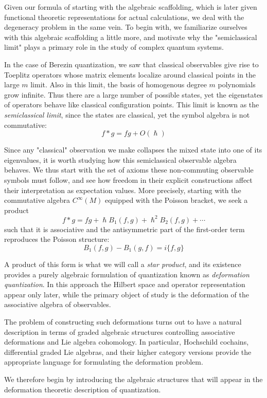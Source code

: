 \documentclass[
  12pt,
  a4paper, oneside
]{report}
\renewcommand{\hbar}{\hslash}
\theoremstyle{bolddef}
\theoremstyle{remark}
\numberwithin{equation}{chapter}
\begin{document}
Given our formula of starting with the algebraic scaffolding, which is later given functional theoretic representations for actual calculations, we deal with the degeneracy problem in the same vein. To begin with, we familiarize ourselves with this algebraic scaffolding a little more, and motivate why the "semiclassical limit" plays a  primary role in the study of complex quantum systems. 

In the case of Berezin quantization, we saw that classical observables give rise to Toeplitz operators whose matrix elements localize around classical points in the large $m$ limit. Also in this limit, the basis of homogenous degree $m$ polynomials grow infinite. Thus there are a large number of possible states, yet the eigenstates of operators behave like classical configuration points. This limit is known as the \textit{semiclassical limit}, since the states are classical, yet the symbol algebra is not commutative: 
$$
f * g = fg + O(\hbar)
$$

Since any "classical" observation we make collapses the mixed state into one of its eigenvalues, it is worth studying how this semiclassical observable algebra behaves. We thus start with the set of axioms these non-commuting observable symbols must follow, and see how freedom in their explicit constructions affect their interpretation as expectation values. More precisely, starting with the commutative algebra $C^\infty(M)$ equipped with the Poisson bracket, we seek a product
$$
f * g = fg + \hbar B_1(f,g) + \hbar^2 B_2(f,g) + \cdots
$$
such that it is associative and the antisymmetric part of the first-order term reproduces the Poisson structure:
$$
B_1(f,g) - B_1(g,f) = i\{f,g\}
$$

A product of this form is what we will call a \emph{star product}, and its existence
provides a purely algebraic formulation of quantization known as
\emph{deformation quantization}. In this approach the Hilbert space and operator representation appear only later, while the primary object of study is the deformation of the associative algebra of observables.

The problem of constructing such deformations turns out to have a natural description in terms of graded algebraic structures controlling associative deformations and Lie algebra cohomology. In particular, Hochschild cochains, differential graded Lie algebras, and their higher category versions provide the appropriate language for formulating the deformation problem.

We therefore begin by introducing the algebraic structures that will appear in the deformation theoretic description of quantization.
\end{document}
